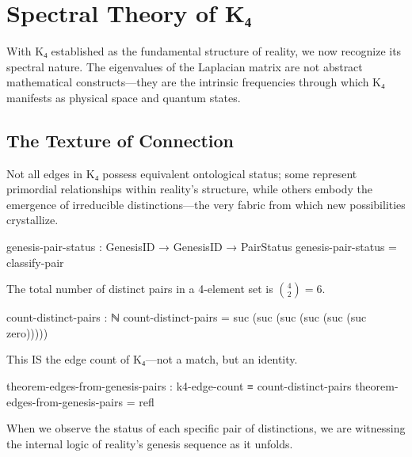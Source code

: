 \documentclass[11pt,a4paper]{book}
\begin{document}

\chapter{Spectral Theory of K₄}
\label{chap:spectral-k4}

With K₄ established as the fundamental structure of reality, we now recognize its spectral nature. The eigenvalues of the Laplacian matrix are not abstract mathematical constructs—they are the intrinsic frequencies through which K₄ manifests as physical space and quantum states.

\section{The Texture of Connection}

Not all edges in K₄ possess equivalent ontological status; some represent primordial relationships within reality's structure, while others embody the emergence of irreducible distinctions—the very fabric from which new possibilities crystallize.

\begin{code}
genesis-pair-status : GenesisID → GenesisID → PairStatus
genesis-pair-status = classify-pair

\end{code}

The total number of distinct pairs in a 4-element set is $\binom{4}{2} = 6$.

\begin{code}
count-distinct-pairs : ℕ
count-distinct-pairs = suc (suc (suc (suc (suc (suc zero)))))

\end{code}

This IS the edge count of K₄—not a match, but an identity.

\begin{code}
theorem-edges-from-genesis-pairs : k4-edge-count ≡ count-distinct-pairs
theorem-edges-from-genesis-pairs = refl

\end{code}

When we observe the status of each specific pair of distinctions, we are witnessing the internal logic of reality's genesis sequence as it unfolds.
\end{document}
